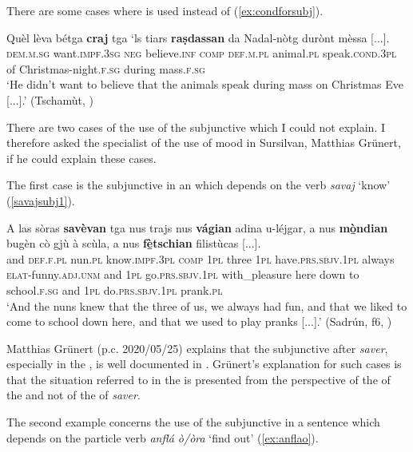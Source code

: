 There are some cases where  is used instead of  (\ref{ex:condforsubj}).

\ea
\label{ex:condforsubj}
\gll Quèl lèva bétga \textbf{craj} tga `ls tiars \textbf{raṣdassan} da Nadal-nòtg durònt mèssa [...].\\
\textsc{dem.m.sg} want.\textsc{impf.3sg} \textsc{neg} believe.\textsc{inf} \textsc{comp} \textsc{def.m.pl} animal.\textsc{pl} speak.\textsc{cond.3pl} of Christmas-night.\textsc{f.sg} during mass.\textsc{f.sg}\\
\glt `He didn't want to believe that the animals speak during mass on Christmas Eve [...].' (Tschamùt, \citealt[132]{Büchli1966})
\z

There are two cases of the use of the subjunctive which I could not explain. I therefore asked the specialist of the use of mood in Sursilvan, Matthias Grünert, if he could explain these cases.

The first case is the subjunctive in an  which depends on the verb \textit{savaj} `know' (\ref{savajsubj1}).

\ea
\label{savajsubj1}
\gll    A las sòras \textbf{savèvan} tga nus trajs nus \textbf{vágian} adina u-léjgar, a nus \textbf{mò̱ndian} bugèn cò gjù à scùla, a nus \textbf{fè̱tschian} filistùcas [...].\\
and \textsc{def.f.pl} nun.\textsc{pl} know.\textsc{impf.3pl} \textsc{comp} \textsc{1pl} three \textsc{1pl} have.\textsc{prs.sbjv.1pl} always \textsc{elat}-funny.\textsc{adj.unm} and \textsc{1pl} go.\textsc{prs.sbjv.1pl} with\_pleasure here down to school.\textsc{f.sg} and \textsc{1pl} do.\textsc{prs.sbjv.1pl} prank.\textsc{pl}\\
\glt `And the nuns knew that the three of us, we always had fun, and that we liked to come to school down here, and that we used to play pranks [...].' (Sadrún, f6, )
\z

Matthias Grünert (p.c. 2020/05/25) explains that the subjunctive after \textit{saver}, especially in the , is well documented in . Grünert's explanation for such cases is that the situation referred to in the  is presented from the perspective of the  of the  and not of the  of \textit{saver}.


The second example concerns the use of the subjunctive in a  sentence which depends on the particle verb \textit{anflá ò/òra} `find out' (\ref{ex:anflao}). 

